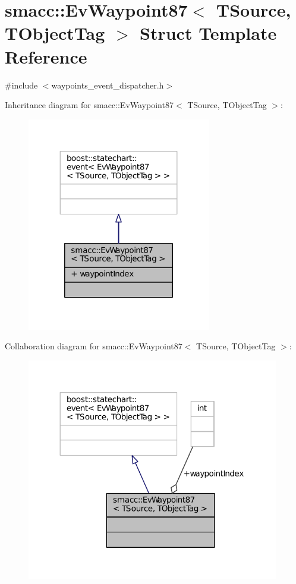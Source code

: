 \hypertarget{structsmacc_1_1EvWaypoint87}{}\section{smacc\+:\+:Ev\+Waypoint87$<$ T\+Source, T\+Object\+Tag $>$ Struct Template Reference}
\label{structsmacc_1_1EvWaypoint87}


{\ttfamily \#include $<$waypoints\+\_\+event\+\_\+dispatcher.\+h$>$}



Inheritance diagram for smacc\+:\+:Ev\+Waypoint87$<$ T\+Source, T\+Object\+Tag $>$\+:
\nopagebreak
\begin{figure}[H]
\begin{center}
\leavevmode
\includegraphics[width=227pt]{structsmacc_1_1EvWaypoint87__inherit__graph}
\end{center}
\end{figure}


Collaboration diagram for smacc\+:\+:Ev\+Waypoint87$<$ T\+Source, T\+Object\+Tag $>$\+:
\nopagebreak
\begin{figure}[H]
\begin{center}
\leavevmode
\includegraphics[width=312pt]{structsmacc_1_1EvWaypoint87__coll__graph}
\end{center}
\end{figure}
